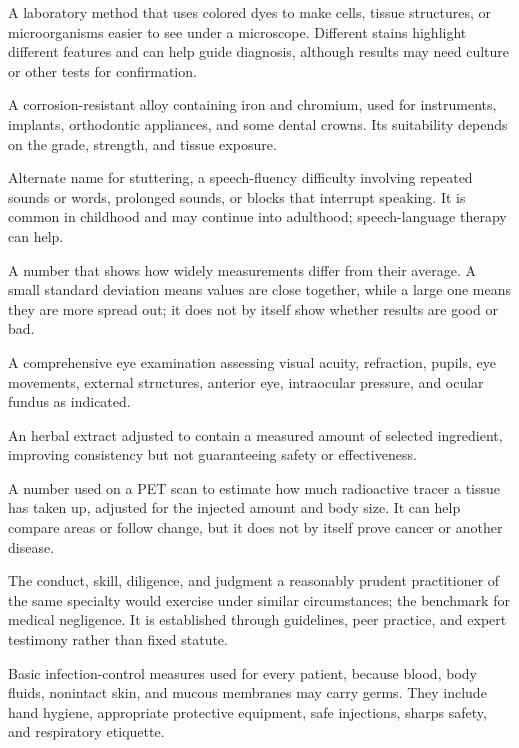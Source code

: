  A laboratory method that uses colored dyes to make cells, tissue structures, or microorganisms easier to see under a microscope. Different stains highlight different features and can help guide diagnosis, although results may need culture or other tests for confirmation.

 A corrosion-resistant alloy containing iron and chromium, used for instruments, implants, orthodontic appliances, and some dental crowns. Its suitability depends on the grade, strength, and tissue exposure.

 Alternate name for stuttering, a speech-fluency difficulty involving repeated sounds or words, prolonged sounds, or blocks that interrupt speaking. It is common in childhood and may continue into adulthood; speech-language therapy can help.

 A number that shows how widely measurements differ from their average. A small standard deviation means values are close together, while a large one means they are more spread out; it does not by itself show whether results are good or bad.

 A comprehensive eye examination assessing visual acuity, refraction, pupils, eye movements, external structures, anterior eye, intraocular pressure, and ocular fundus as indicated.

 An herbal extract adjusted to contain a measured amount of selected ingredient, improving consistency but not guaranteeing safety or effectiveness.

 A number used on a PET scan to estimate how much radioactive tracer a tissue has taken up, adjusted for the injected amount and body size. It can help compare areas or follow change, but it does not by itself prove cancer or another disease.

 The conduct, skill, diligence, and judgment a reasonably prudent practitioner of the
same specialty would exercise under similar circumstances; the benchmark for medical
negligence. It is established through guidelines, peer practice, and expert testimony
rather than fixed statute.

 Basic infection-control measures used for every patient, because blood, body fluids, nonintact skin, and mucous membranes may carry germs. They include hand hygiene, appropriate protective equipment, safe injections, sharps safety, and respiratory etiquette.


